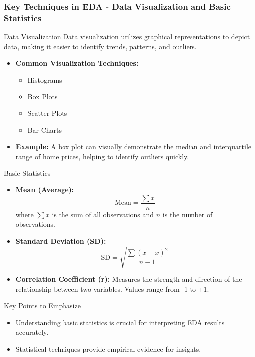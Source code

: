 \documentclass[aspectratio=169]{beamer}
\begin{document}
\begin{frame}[fragile]
    \frametitle{Key Techniques in EDA - Data Visualization and Basic Statistics}
    \begin{block}{Data Visualization}
        Data visualization utilizes graphical representations to depict data, making it easier to identify trends, patterns, and outliers.
    \end{block}
    \begin{itemize}
        \item \textbf{Common Visualization Techniques:}
        \begin{itemize}
            \item Histograms
            \item Box Plots
            \item Scatter Plots
            \item Bar Charts
        \end{itemize}
        \item \textbf{Example:} A box plot can visually demonstrate the median and interquartile range of home prices, helping to identify outliers quickly.
    \end{itemize}
    \begin{block}{Basic Statistics}
        \begin{itemize}
            \item \textbf{Mean (Average):} 
            \begin{equation}
                \text{Mean} = \frac{\sum x}{n}  
            \end{equation}
            where $\sum x$ is the sum of all observations and $n$ is the number of observations.
            \item \textbf{Standard Deviation (SD):}
            \begin{equation}
                \text{SD} = \sqrt{\frac{\sum (x - \bar{x})^2}{n-1}}
            \end{equation}
            \item \textbf{Correlation Coefficient (r):} Measures the strength and direction of the relationship between two variables. Values range from -1 to +1.
        \end{itemize}
    \end{block}
    \begin{block}{Key Points to Emphasize}
        \begin{itemize}
            \item Understanding basic statistics is crucial for interpreting EDA results accurately.
            \item Statistical techniques provide empirical evidence for insights.
        \end{itemize}
    \end{block}
\end{frame}
\end{document}
